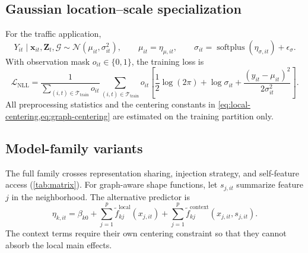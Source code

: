 \documentclass[11pt]{article}
\newcommand{\trainset}{\mathcal{T}_{\mathrm{train}}}
\newcommand{\graph}{\mathcal{G}}
\newcommand{\softplus}{\operatorname{softplus}}
\begin{document}
\subsection{Gaussian location--scale specialization}

For the traffic application,
\begin{equation}
  Y_{it}\mid\bm{x}_{it},\bm{Z}_t,\graph
  \sim\mathcal{N}(\mu_{it},\sigma_{it}^2),
  \qquad
  \mu_{it}=\eta_{\mu,it},
  \qquad
  \sigma_{it}=\softplus(\eta_{\sigma,it})+\epsilon_\sigma.
  \label{eq:gaussian-links}
\end{equation}
With observation mask $o_{it}\in\{0,1\}$, the training loss is
\begin{equation}
  \mathcal{L}_{\mathrm{NLL}}
  =
  \frac{1}{\sum_{(i,t)\in\trainset}o_{it}}
  \sum_{(i,t)\in\trainset}o_{it}
  \left[
    \frac{1}{2}\log(2\pi)
    +\log\sigma_{it}
    +\frac{(y_{it}-\mu_{it})^2}{2\sigma_{it}^2}
  \right].
  \label{eq:nll}
\end{equation}
All preprocessing statistics and the centering constants in
\cref{eq:local-centering,eq:graph-centering} are estimated on the training
partition only.

\subsection{Model-family variants}

The full family crosses representation sharing, injection strategy, and
self-feature access (\cref{tab:matrix}). For graph-aware shape functions, let
$s_{j,it}$ summarize feature $j$ in the neighborhood. The alternative predictor
is
\begin{equation}
  \eta_{k,it}
  =
  \beta_{k0}
  +\sum_{j=1}^{p}\widetilde f^{\mathrm{local}}_{kj}(x_{j,it})
  +\sum_{j=1}^{p}\widetilde f^{\mathrm{context}}_{kj}
    (x_{j,it},s_{j,it}).
  \label{eq:context-shape}
\end{equation}
The context terms require their own centering constraint so that they cannot
absorb the local main effects.
\end{document}
